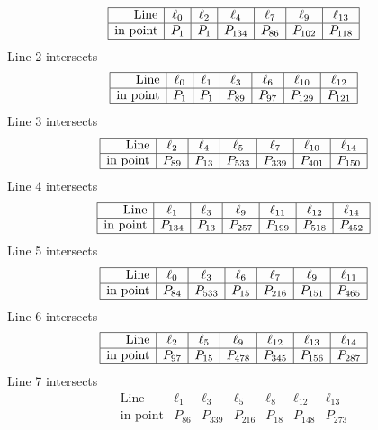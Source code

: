 \documentclass{article}
\begin{document}
{$$\begin{array}{|r*{6}{|c}|}
\hline
\mbox{Line}  & \ell_{0} & \ell_{2} & \ell_{4} & \ell_{7} & \ell_{9} & \ell_{13}\\
\hline
\mbox{in point}  & P_{1} & P_{1} & P_{134} & P_{86} & P_{102} & P_{118}\\
\hline
\end{array}
$$
Line 2 intersects 
$$
\begin{array}{|r*{6}{|c}|}
\hline
\mbox{Line}  & \ell_{0} & \ell_{1} & \ell_{3} & \ell_{6} & \ell_{10} & \ell_{12}\\
\hline
\mbox{in point}  & P_{1} & P_{1} & P_{89} & P_{97} & P_{129} & P_{121}\\
\hline
\end{array}
$$
Line 3 intersects 
$$
\begin{array}{|r*{6}{|c}|}
\hline
\mbox{Line}  & \ell_{2} & \ell_{4} & \ell_{5} & \ell_{7} & \ell_{10} & \ell_{14}\\
\hline
\mbox{in point}  & P_{89} & P_{13} & P_{533} & P_{339} & P_{401} & P_{150}\\
\hline
\end{array}
$$
Line 4 intersects 
$$
\begin{array}{|r*{6}{|c}|}
\hline
\mbox{Line}  & \ell_{1} & \ell_{3} & \ell_{9} & \ell_{11} & \ell_{12} & \ell_{14}\\
\hline
\mbox{in point}  & P_{134} & P_{13} & P_{257} & P_{199} & P_{518} & P_{452}\\
\hline
\end{array}
$$
Line 5 intersects 
$$
\begin{array}{|r*{6}{|c}|}
\hline
\mbox{Line}  & \ell_{0} & \ell_{3} & \ell_{6} & \ell_{7} & \ell_{9} & \ell_{11}\\
\hline
\mbox{in point}  & P_{84} & P_{533} & P_{15} & P_{216} & P_{151} & P_{465}\\
\hline
\end{array}
$$
Line 6 intersects 
$$
\begin{array}{|r*{6}{|c}|}
\hline
\mbox{Line}  & \ell_{2} & \ell_{5} & \ell_{9} & \ell_{12} & \ell_{13} & \ell_{14}\\
\hline
\mbox{in point}  & P_{97} & P_{15} & P_{478} & P_{345} & P_{156} & P_{287}\\
\hline
\end{array}
$$
Line 7 intersects 
$$
\begin{array}{|r*{6}{|c}|}
\hline
\mbox{Line}  & \ell_{1} & \ell_{3} & \ell_{5} & \ell_{8} & \ell_{12} & \ell_{13}\\
\hline
\mbox{in point}  & P_{86} & P_{339} & P_{216} & P_{18} & P_{148} & P_{273}\\

\end{array}$$}
\end{document}
